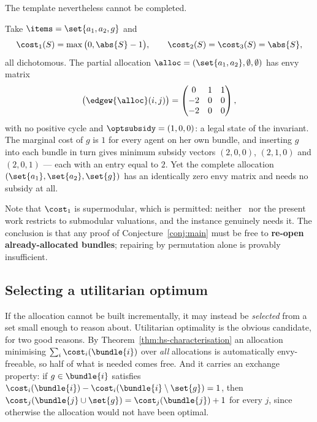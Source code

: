 The template nevertheless cannot be completed.

\begin{example}
\label{main:ex-insertion}
Take $\items = \set{a_1,a_2,g}$ and
\[
  \cost_1(S) = \max\big(0, \abs{S} - 1\big), \qquad
  \cost_2(S) = \cost_3(S) = \abs{S},
\]
all dichotomous. The partial allocation
$\alloc = (\set{a_1,a_2}, \emptyset, \emptyset)$ has envy matrix
\[
  \big(\edgew{\alloc}(i,j)\big) =
  \begin{pmatrix} 0 & 1 & 1 \\ -2 & 0 & 0 \\ -2 & 0 & 0 \end{pmatrix},
\]
with no positive cycle and $\optsubsidy = (1,0,0)$: a legal state of the
invariant. The marginal cost of $g$ is $1$ for every agent on her own bundle, and
inserting $g$ into each bundle in turn gives minimum subsidy vectors
$(2,0,0)$, $(2,1,0)$ and $(2,0,1)$ --- each with an entry equal to $2$. Yet the
complete allocation $(\set{a_1}, \set{a_2}, \set{g})$ has an identically zero
envy matrix and needs no subsidy at all.
\end{example}

Note that $\cost_1$ is supermodular, which is permitted: neither~\cite{BKNS22}
nor the present work restricts to submodular valuations, and the instance
genuinely needs it. The conclusion is that any proof of
Conjecture~\ref{conj:main} must be free to \textbf{re-open already-allocated
bundles}; repairing by permutation alone is provably insufficient.

\subsection{Selecting a utilitarian optimum}
\label{sec:main-utilitarian}

If the allocation cannot be built incrementally, it may instead be
\emph{selected} from a set small enough to reason about. Utilitarian optimality
is the obvious candidate, for two good reasons. By
Theorem~\ref{thm:hs-characterisation} an allocation minimising
$\sum_i \cost_i(\bundle{i})$ over \emph{all} allocations is automatically
envy-freeable, so half of what is needed comes free. And it carries an exchange
property: if $g \in \bundle{i}$ satisfies $\cost_i(\bundle{i}) -
\cost_i(\bundle{i} \setminus \set{g}) = 1$, then $\cost_j(\bundle{j} \cup
\set{g}) = \cost_j(\bundle{j}) + 1$ for every $j$, since otherwise the
allocation would not have been optimal.

